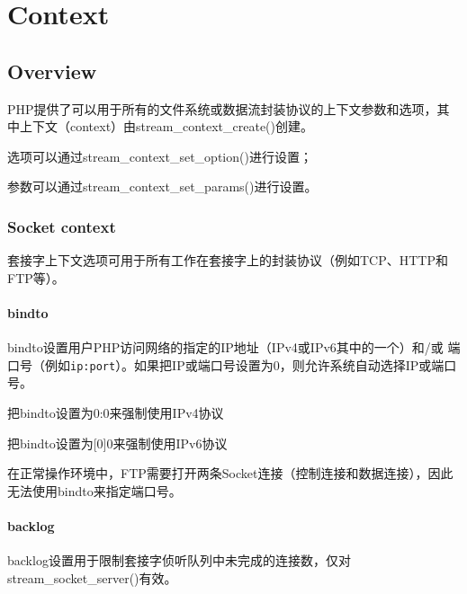 \part{Context}


\chapter{Overview}


PHP提供了可以用于所有的文件系统或数据流封装协议的上下文参数和选项，其中上下文（context）由stream\_context\_create()创建。

\begin{compactitem}
\item 选项可以通过stream\_context\_set\_option()进行设置；
\item 参数可以通过stream\_context\_set\_params()进行设置。
\end{compactitem}


\section{Socket context}


套接字上下文选项可用于所有工作在套接字上的封装协议（例如TCP、HTTP和FTP等）。


\subsection{bindto}

bindto设置用户PHP访问网络的指定的IP地址（IPv4或IPv6其中的一个）和/或 端口号（例如\texttt{ip:port}）。如果把IP或端口号设置为0，则允许系统自动选择IP或端口号。

\begin{compactitem}
\item 把bindto设置为0:0来强制使用IPv4协议
\item 把bindto设置为[0]0来强制使用IPv6协议
\end{compactitem}


在正常操作环境中，FTP需要打开两条Socket连接（控制连接和数据连接），因此无法使用bindto来指定端口号。



\subsection{backlog}

backlog设置用于限制套接字侦听队列中未完成的连接数，仅对stream\_socket\_server()有效。

